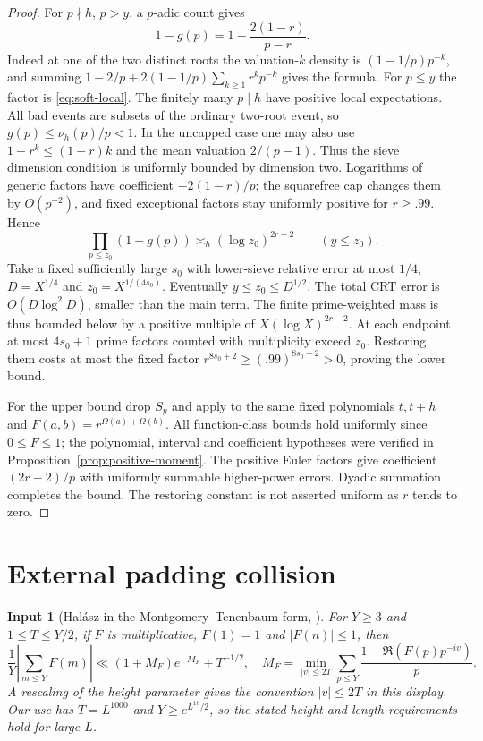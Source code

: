\documentclass[11pt]{article}
\newtheorem{inputthm}[theorem]{Input}
\theoremstyle{definition}
\theoremstyle{remark}
\numberwithin{equation}{section}
\begin{document}
\begin{proof}
For $p\nmid h$, $p>y$, a $p$-adic count gives
\begin{equation}\label{eq:full-uncapped-local}
 1-g(p)=1-\frac{2(1-r)}{p-r}.
\end{equation}
Indeed at one of the two distinct roots the valuation-$k$ density is $(1-1/p)p^{-k}$, and summing
$1-2/p+2(1-1/p)\sum_{k\ge1}r^kp^{-k}$ gives the formula.
For $p\le y$ the factor is \eqref{eq:soft-local}. The finitely many $p\mid h$ have positive local expectations.
All bad events are subsets of the ordinary two-root event, so $g(p)\le\nu_h(p)/p<1$.
In the uncapped case one may also use $1-r^k\le(1-r)k$ and the mean valuation $2/(p-1)$.
Thus the sieve dimension condition is uniformly bounded by dimension two. Logarithms of generic factors have
coefficient $-2(1-r)/p$; the squarefree cap changes them by $O(p^{-2})$, and fixed exceptional factors stay
uniformly positive for $r\ge.99$. Hence
\begin{equation}\label{eq:full-local-product}
 \prod_{p\le z_0}(1-g(p))\asymp_h(\log z_0)^{2r-2}\qquad(y\le z_0).
\end{equation}
Take a fixed sufficiently large $s_0$ with lower-sieve relative error at most $1/4$,
$D=X^{1/4}$ and $z_0=X^{1/(4s_0)}$. Eventually $y\le z_0\le D^{1/2}$.
The total CRT error is $O(D\log^2D)$, smaller than the main term.
The finite prime-weighted mass is thus bounded below by a positive multiple of $X(\log X)^{2r-2}$.
At each endpoint at most $4s_0+1$ prime factors counted with multiplicity exceed $z_0$.
Restoring them costs at most the fixed factor
$r^{8s_0+2}\ge(.99)^{8s_0+2}>0$, proving the lower bound.

For the upper bound drop $S_y$ and apply \cite[Theorem~1, pp.~1--2]{Henriot} to the same fixed polynomials
$t,t+h$ and $F(a,b)=r^{\Omega(a)+\Omega(b)}$.
All function-class bounds hold uniformly since $0\le F\le1$; the polynomial, interval and coefficient
hypotheses were verified in Proposition~\ref{prop:positive-moment}.
The positive Euler factors give coefficient $(2r-2)/p$ with uniformly summable higher-power errors.
Dyadic summation completes the bound. The restoring constant is not asserted uniform as $r$ tends to zero.
\end{proof}

\section{External padding collision}\label{sec:full-collision}

\begin{inputthm}[Hal\'asz in the Montgomery--Tenenbaum form, {\cite[Chapter~III.4]{Tenenbaum}}]\label{input:halasz}
For $Y\ge3$ and $1\le T\le Y/2$, if $F$ is multiplicative, $F(1)=1$ and $|F(n)|\le1$, then
\begin{equation}\label{eq:halasz}
 \frac1Y\left|\sum_{m\le Y}F(m)\right|
 \ll(1+M_F)e^{-M_F}+T^{-1/2},\quad
 M_F=\min_{|v|\le2T}\sum_{p\le Y}\frac{1-\Re(F(p)p^{-iv})}p.
\end{equation}
A rescaling of the height parameter gives the convention $|v|\le2T$ in this display.
Our use has $T=L^{1000}$ and $Y\ge e^{L^{18}/2}$, so the stated height and length requirements hold for large $L$.
\end{inputthm}
\end{document}
